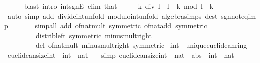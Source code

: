 \begin{isabellebody}
\ \ \ \ \isamarkupfalse%
\ {\isacharparenleft}{\kern0pt}blast\ intro{\isacharcolon}{\kern0pt}\ int{\isacharunderscore}{\kern0pt}sgnE\ elim{\isacharcolon}{\kern0pt}\ that{\isacharparenright}{\kern0pt}\isanewline
\ \ \isamarkupfalse%
\ \isamarkupfalse%
\ {\isachardoublequoteopen}k\ div\ l\ {\isacharasterisk}{\kern0pt}\ l\ {\isacharplus}{\kern0pt}\ k\ mod\ l\ {\isacharequal}{\kern0pt}\ k{\isachardoublequoteclose}\isanewline
\ \ \ \ \isamarkupfalse%
\ {\isacharparenleft}{\kern0pt}auto\ simp\ add{\isacharcolon}{\kern0pt}\ divide{\isacharunderscore}{\kern0pt}int{\isacharunderscore}{\kern0pt}unfold\ modulo{\isacharunderscore}{\kern0pt}int{\isacharunderscore}{\kern0pt}unfold\ algebra{\isacharunderscore}{\kern0pt}simps\ dest{\isacharbang}{\kern0pt}{\isacharcolon}{\kern0pt}\ sgn{\isacharunderscore}{\kern0pt}not{\isacharunderscore}{\kern0pt}eq{\isacharunderscore}{\kern0pt}imp{\isacharparenright}{\kern0pt}\isanewline
\ \ \ \ \ \ \ {\isacharparenleft}{\kern0pt}simp{\isacharunderscore}{\kern0pt}all\ add{\isacharcolon}{\kern0pt}\ of{\isacharunderscore}{\kern0pt}nat{\isacharunderscore}{\kern0pt}mult\ {\isacharbrackleft}{\kern0pt}symmetric{\isacharbrackright}{\kern0pt}\ of{\isacharunderscore}{\kern0pt}nat{\isacharunderscore}{\kern0pt}add\ {\isacharbrackleft}{\kern0pt}symmetric{\isacharbrackright}{\kern0pt}\isanewline
\ \ \ \ \ \ \ \ \ distrib{\isacharunderscore}{\kern0pt}left\ {\isacharbrackleft}{\kern0pt}symmetric{\isacharbrackright}{\kern0pt}\ minus{\isacharunderscore}{\kern0pt}mult{\isacharunderscore}{\kern0pt}right\isanewline
\ \ \ \ \ \ \ \ \ del{\isacharcolon}{\kern0pt}\ of{\isacharunderscore}{\kern0pt}nat{\isacharunderscore}{\kern0pt}mult\ minus{\isacharunderscore}{\kern0pt}mult{\isacharunderscore}{\kern0pt}right\ {\isacharbrackleft}{\kern0pt}symmetric{\isacharbrackright}{\kern0pt}{\isacharparenright}{\kern0pt}\isanewline
{}\isamarkupfalse%
%
\endisatagproof
{\isafoldproof}%
%
\isadelimproof
%
\endisadelimproof
\isanewline
\isanewline
{}\isamarkupfalse%
\isanewline
\isanewline
{}\isamarkupfalse%
\ int\ {\isacharcolon}{\kern0pt}{\isacharcolon}{\kern0pt}\ unique{\isacharunderscore}{\kern0pt}euclidean{\isacharunderscore}{\kern0pt}ring\isanewline
{}\isanewline
\isanewline
{}\isamarkupfalse%
\ euclidean{\isacharunderscore}{\kern0pt}size{\isacharunderscore}{\kern0pt}int\ {\isacharcolon}{\kern0pt}{\isacharcolon}{\kern0pt}\ {\isachardoublequoteopen}int\ {\isasymRightarrow}\ nat{\isachardoublequoteclose}\isanewline
\ \ \ {\isacharbrackleft}{\kern0pt}simp{\isacharbrackright}{\kern0pt}{\isacharcolon}{\kern0pt}\ {\isachardoublequoteopen}euclidean{\isacharunderscore}{\kern0pt}size{\isacharunderscore}{\kern0pt}int\ {\isacharequal}{\kern0pt}\ {\isacharparenleft}{\kern0pt}nat\ {\isasymcirc}\ abs\ {\isacharcolon}{\kern0pt}{\isacharcolon}{\kern0pt}\ int\ {\isasymRightarrow}\ nat{\isacharparenright}{\kern0pt}{\isachardoublequoteclose}\isanewline

\end{isabellebody}
